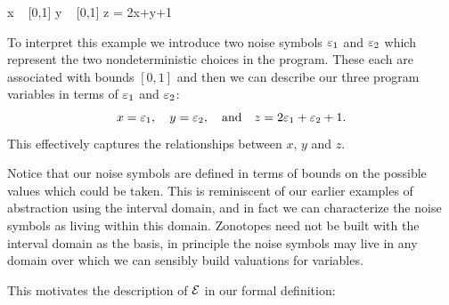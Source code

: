 \begin{code}
  x ~ [0,1]
  y ~ [0,1]
  z = 2x+y+1
\end{code}

To interpret this example we introduce two noise symbols $\varepsilon_1$ and $\varepsilon_2$ which represent the two nondeterministic choices in the program.
These each are associated with bounds $[0,1]$ and then we can describe our three program variables in terms of $\varepsilon_1$ and $\varepsilon_2$:
\[x = \varepsilon_1, \quad y = \varepsilon_2, \quad \text{and} \quad z = 2\varepsilon_1 + \varepsilon_2 + 1.\]
This effectively captures the relationships between $x$, $y$ and $z$.

Notice that our noise symbols are defined in terms of bounds on the possible values which could be taken.
This is reminiscent of our earlier examples of abstraction using the interval domain, and in fact we can characterize the noise symbols as living within this domain.
Zonotopes need not be built with the interval domain as the basis, in principle the noise symbols may live in any domain over which we can sensibly build valuations for variables.

This motivates the description of $\mathcal{E}$ in our formal definition:

